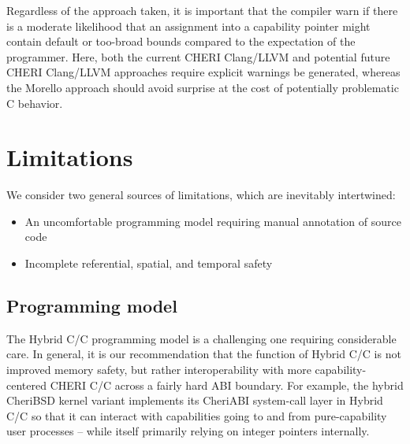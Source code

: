 \documentclass[12pt,twoside,openright,a4paper]{article}
\newcommand{\note}[2]{{\color{blue}[ Note: #1 - #2]}}
\renewcommand{\note}[2]{\relax\ifhmode\unskip\fi}
\newcommand{\psnote}[1]{\note{#1}{Peter S.}}
\newcommand{\dcnote}[1]{\note{#1}{David}}
\newcommand*{\cpp}{\texorpdfstring{C\textsmaller[2]{\protect\nolinebreak[4]\hspace{-.05em}\raisebox{.45ex}{\textbf{++}}}}{C++}}
\newcommand*{\COrCpp}{C/\cpp{}}
\newcommand*{\purecapCOrCpp}{CHERI \COrCpp{}}
\newcommand*{\hybridCOrCpp}{Hybrid \COrCpp{}}
\begin{document}
Regardless of the approach taken, it is important that the compiler warn if
there is a moderate likelihood that an assignment into a capability pointer
might contain default or too-broad bounds compared to the expectation of the
programmer.
Here, both the current CHERI Clang/LLVM and potential future CHERI Clang/LLVM
approaches require explicit warnings be generated, whereas the Morello
approach should avoid surprise at the cost of potentially problematic C
behavior.
\psnote{That last sentence is structured as an opposition -- but warnings and avoiding surprise seem consonant...}

\dcnote{This section is missing any description of C++ references.  I recall
that there were some fun corner cases here, for example if you have a
cap-pointer to an object (which may not be in DDC), what is the type of a
reference to that reference?}

\section{Limitations}

We consider two general sources of limitations, which are inevitably
intertwined:

\begin{itemize}
\item An uncomfortable programming model requiring manual annotation of
  source code
\item Incomplete referential, spatial, and temporal safety
\end{itemize}

\subsection{Programming model}

The \hybridCOrCpp{} programming model is a challenging one requiring
considerable care.
In general, it is our recommendation that the function of \hybridCOrCpp{} is
not improved memory safety, but rather interoperability with more
capability-centered \purecapCOrCpp{} across a fairly hard ABI boundary.
For example, the hybrid CheriBSD kernel variant implements its CheriABI
system-call layer in \hybridCOrCpp{} so that it can interact with capabilities
going to and from pure-capability user processes -- while itself primarily
relying on integer pointers internally.
\end{document}
